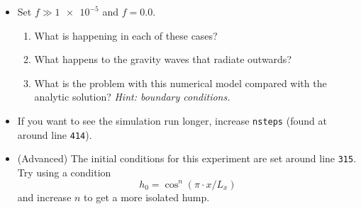 \documentclass[a4paper, sfsidenotes, twoside]{tufte-handout}
\begin{document}
\begin{itemize}
    \begin{itemize}
      \item Set $f \gg \num{1e-5}$ and $f = \num{0.0}$.
      \begin{enumerate}
        \item What is happening in each of these cases?
        \item What happens to the gravity waves that radiate outwards?
        \item What is the problem with this numerical model compared with the analytic solution? \emph{Hint: boundary conditions.}
      \end{enumerate}
      \item If you want to see the simulation run longer, increase \texttt{nsteps} (found at around line \texttt{414}).
      \item (Advanced) The initial conditions for this experiment are set around line \texttt{315}.
      Try using a condition
      \begin{equation*}
        h_0 = \cos^n(\pi \cdot x / L_x)
      \end{equation*}
      and increase $n$ to get a more isolated hump.
    \end{itemize}
  \end{itemize}

  \pagebreak
\end{document}
